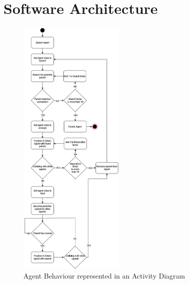 \section*{Software Architecture}
\label{append:c}
\begin{figure}[ht]
    \includegraphics[width=0.45\textwidth]{./Images/AgentActivityDiagram.png}
    \centering
    \caption{Agent Behaviour represented in an Activity Diagram}
    \label{activity-diagram}
\end{figure}